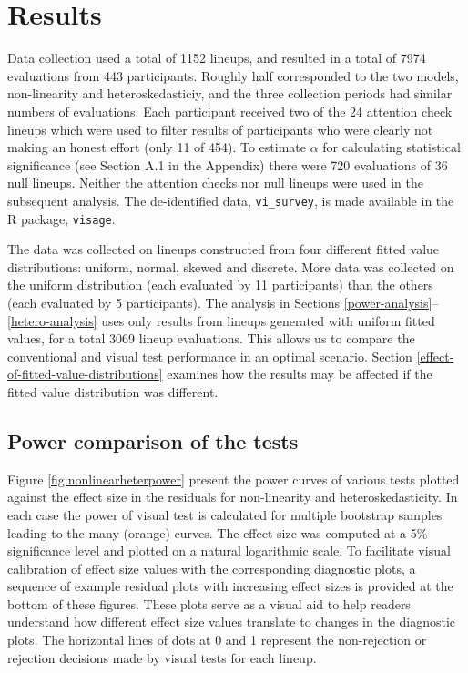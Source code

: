 \documentclass[]{interact}
\theoremstyle{plain}%
\theoremstyle{definition}
\theoremstyle{remark}
\begin{document}
\hypertarget{results}{%
\section{Results}\label{results}}

Data collection used a total of 1152 lineups, and resulted in a total of
7974 evaluations from 443 participants. Roughly half corresponded to the
two models, non-linearity and heteroskedasticiy, and the three
collection periods had similar numbers of evaluations. Each participant
received two of the 24 attention check lineups which were used to filter
results of participants who were clearly not making an honest effort
(only 11 of 454). To estimate \(\alpha\) for calculating statistical
significance (see Section A.1 in the Appendix) there were 720
evaluations of 36 null lineups. Neither the attention checks nor null
lineups were used in the subsequent analysis. The de-identified data,
\texttt{vi\_survey}, is made available in the R package,
\texttt{visage}.

The data was collected on lineups constructed from four different fitted
value distributions: uniform, normal, skewed and discrete. More data was
collected on the uniform distribution (each evaluated by 11
participants) than the others (each evaluated by 5 participants). The
analysis in Sections \ref{power-analysis}--\ref{hetero-analysis} uses
only results from lineups generated with uniform fitted values, for a
total 3069 lineup evaluations. This allows us to compare the
conventional and visual test performance in an optimal scenario. Section
\ref{effect-of-fitted-value-distributions} examines how the results may
be affected if the fitted value distribution was different.

\hypertarget{power-comparison-of-the-tests}{%
\subsection{\texorpdfstring{Power comparison of the
tests\label{power-analysis}}{Power comparison of the tests}}\label{power-comparison-of-the-tests}}

Figure \ref{fig:nonlinearheterpower} present the power curves of various
tests plotted against the effect size in the residuals for non-linearity
and heteroskedasticity. In each case the power of visual test is
calculated for multiple bootstrap samples leading to the many (orange)
curves. The effect size was computed at a 5\% significance level and
plotted on a natural logarithmic scale. To facilitate visual calibration
of effect size values with the corresponding diagnostic plots, a
sequence of example residual plots with increasing effect sizes is
provided at the bottom of these figures. These plots serve as a visual
aid to help readers understand how different effect size values
translate to changes in the diagnostic plots. The horizontal lines of
dots at 0 and 1 represent the non-rejection or rejection decisions made
by visual tests for each lineup.
\end{document}
